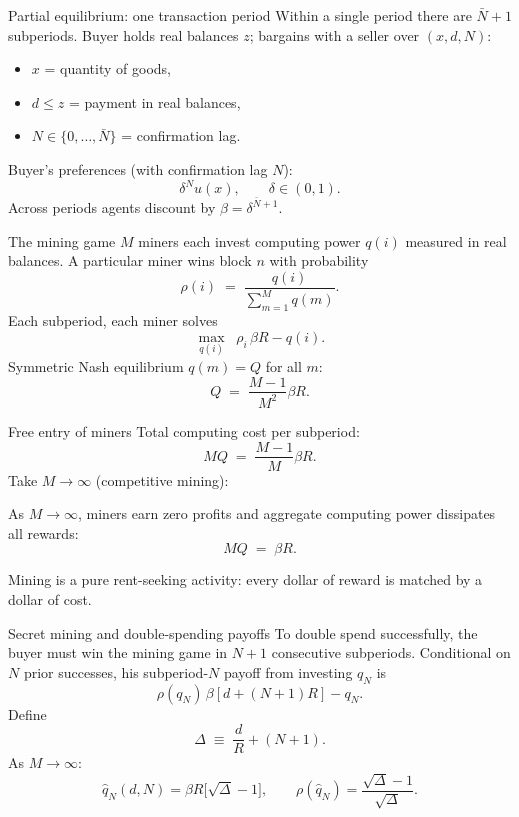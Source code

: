\documentclass[aspectratio=169,xcolor=dvipsnames]{beamer}
\begin{document}
\begin{frame}{Partial equilibrium: one transaction period}
    Within a single period there are $\bar N+1$ subperiods.
    Buyer holds real balances $z$; bargains with a seller over $(x,d,N)$:
    \vspace{2mm}
    \begin{itemize}
        \item $x$ = quantity of goods,
        \item $d\le z$ = payment in real balances,
        \item $N\in\{0,\ldots,\bar N\}$ = confirmation lag.
    \end{itemize}
    \vspace{3mm}
    Buyer's preferences (with confirmation lag $N$):
    \[
        \delta^N u(x),\qquad \delta\in(0,1).
    \]
    Across periods agents discount by $\beta = \delta^{\bar N+1}$.
\end{frame}

\begin{frame}{The mining game}
    $M$ miners each invest computing power $q(i)$ measured in real balances.
    A particular miner wins block $n$ with probability
    \[
        \rho(i) \;=\; \frac{q(i)}{\sum_{m=1}^M q(m)}. \tag{3}
    \]
    Each subperiod, each miner solves
    \[
        \max_{q(i)} \;\; \rho_i\,\beta R - q(i). \tag{4}
    \]
    Symmetric Nash equilibrium $q(m)=Q$ for all $m$:
    \[
        Q \;=\; \frac{M-1}{M^2}\beta R. \tag{6}
    \]
\end{frame}

\begin{frame}{Free entry of miners}
    Total computing cost per subperiod:
    \[
        MQ \;=\; \frac{M-1}{M}\beta R. \tag{7}
    \]
    Take $M\to\infty$ (competitive mining):
    \vspace{2mm}
    \begin{lemma}
        As $M\to\infty$, miners earn zero profits and aggregate computing power dissipates all rewards:
        \[
            MQ \;=\; \beta R.
        \]
    \end{lemma}
    \vspace{2mm}
    Mining is a pure rent-seeking activity: every dollar of reward is matched by a dollar of cost.
\end{frame}

\begin{frame}{Secret mining and double-spending payoffs}
    To double spend successfully, the buyer must win the mining game in $N+1$ consecutive subperiods.
    Conditional on $N$ prior successes, his subperiod-$N$ payoff from investing $q_N$ is
    \[
        \rho(q_N)\,\beta[d + (N+1)R] - q_N. \tag{9}
    \]
    Define
    \[
        \Delta \;\equiv\; \frac{d}{R} + (N+1). \tag{11}
    \]
    As $M\to\infty$:
    \[
        \hat q_N(d,N) = \beta R\bigl[\sqrt{\Delta} - 1\bigr], \qquad
        \rho(\hat q_N) = \frac{\sqrt{\Delta}-1}{\sqrt{\Delta}}. \tag{12,13}
    \]
\end{frame}
\end{document}
